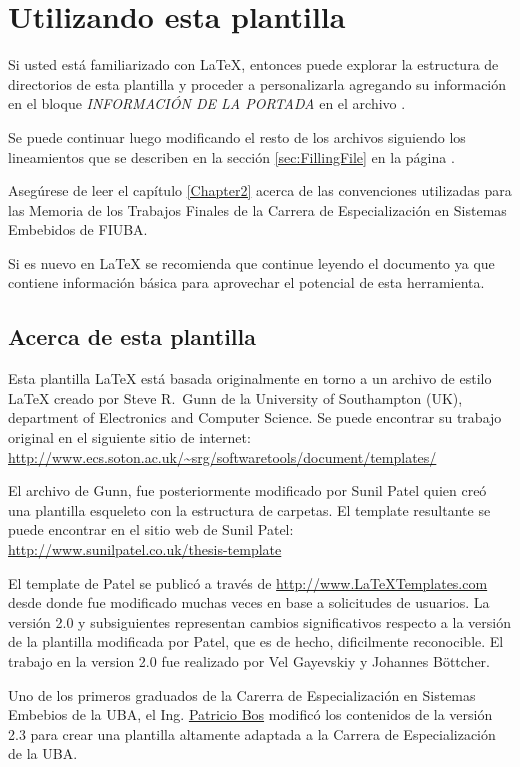 \section{Utilizando esta plantilla}

Si usted está familiarizado con \LaTeX{}, entonces puede explorar la estructura de directorios de esta plantilla y proceder a personalizarla agregando su información en el bloque \emph{INFORMACIÓN DE LA PORTADA} en el archivo .  

Se puede continuar luego modificando el resto de los archivos siguiendo los lineamientos que se describen en la sección \ref{sec:FillingFile} en la página \pageref{sec:FillingFile}.

Asegúrese de leer el capítulo \ref{Chapter2} acerca de las convenciones utilizadas para las Memoria de los Trabajos Finales de la Carrera de Especialización en Sistemas Embebidos de FIUBA.

Si es nuevo en \LaTeX{} se recomienda que continue leyendo el documento ya que contiene información básica para aprovechar el potencial de esta herramienta.


\subsection{Acerca de esta plantilla}

Esta plantilla \LaTeX{} está basada originalmente en torno a un archivo de estilo \LaTeX{} creado por Steve R.\ Gunn de la  University of Southampton (UK), department of Electronics and Computer Science. Se puede encontrar su trabajo original en el siguiente sitio de internet:
\url{http://www.ecs.soton.ac.uk/~srg/softwaretools/document/templates/}

El archivo de Gunn,  fue posteriormente modificado por Sunil Patel quien creó una plantilla esqueleto con la estructura de carpetas. El template resultante se puede encontrar en el sitio web de Sunil Patel:
\url{http://www.sunilpatel.co.uk/thesis-template}

El template de Patel se publicó a través de  \url{http://www.LaTeXTemplates.com} desde donde fue modificado muchas veces en base a solicitudes de usuarios. La versión 2.0 y subsiguientes representan cambios significativos respecto a la versión de la plantilla modificada por Patel, que es de hecho, dificilmente reconocible. El trabajo en la version 2.0 fue realizado por Vel Gayevskiy y Johannes Böttcher.

Uno de los primeros graduados de la Carerra de Especialización en Sistemas Embebios de la UBA, el Ing. \href{mailto:pbos@fi.uba.ar}{Patricio Bos} modificó los contenidos de la versión 2.3 para crear una plantilla altamente adaptada a la Carrera de Especialización de la UBA.

